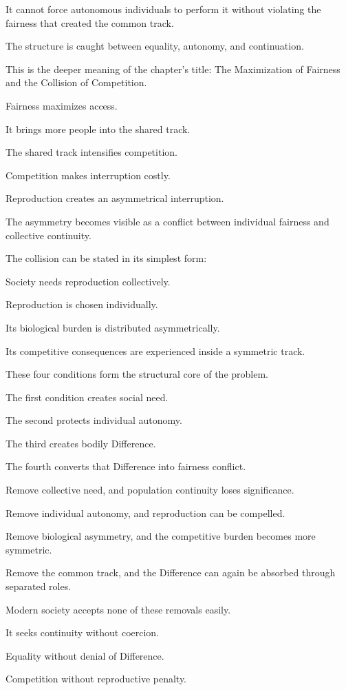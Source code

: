 It cannot force autonomous individuals to perform it without violating the fairness that created the common track.

The structure is caught between equality, autonomy, and continuation.

This is the deeper meaning of the chapter’s title: The Maximization of Fairness and the Collision of Competition.

Fairness maximizes access.

It brings more people into the shared track.

The shared track intensifies competition.

Competition makes interruption costly.

Reproduction creates an asymmetrical interruption.

The asymmetry becomes visible as a conflict between individual fairness and collective continuity.

The collision can be stated in its simplest form:

Society needs reproduction collectively.

Reproduction is chosen individually.

Its biological burden is distributed asymmetrically.

Its competitive consequences are experienced inside a symmetric track.

These four conditions form the structural core of the problem.

The first condition creates social need.

The second protects individual autonomy.

The third creates bodily Difference.

The fourth converts that Difference into fairness conflict.

Remove collective need, and population continuity loses significance.

Remove individual autonomy, and reproduction can be compelled.

Remove biological asymmetry, and the competitive burden becomes more symmetric.

Remove the common track, and the Difference can again be absorbed through separated roles.

Modern society accepts none of these removals easily.

It seeks continuity without coercion.

Equality without denial of Difference.

Competition without reproductive penalty.

